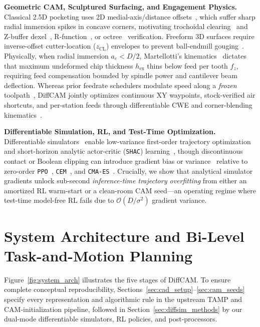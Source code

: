 \documentclass[conference]{IEEEtran}
\begin{document}
\textbf{Geometric CAM, Sculptured Surfacing, and Engagement Physics.}
Classical 2.5D pocketing uses 2D medial-axis/distance offsets~\cite{held1991pocket}, which suffer sharp radial immersion spikes in concave corners, motivating trochoidal clearing~\cite{rauch2009trochoidal} and Z-buffer dexel~\cite{vanhook1986dexel}, R-function~\cite{shapiro2007rfunctions}, or octree~\cite{coffland2021camotics} verification. Freeform 3D surfaces require inverse-offset cutter-location ($z_{\text{CL}}$) envelopes to prevent ball-endmill gouging~\cite{choi1998sculptured}. Physically, when radial immersion $a_e < D/2$, Martellotti's kinematics~\cite{martellotti1941milling,altintas2012manufacturing} dictates that maximum undeformed chip thickness $h_{\text{ex}}$ thins below feed per tooth $f_z$, requiring feed compensation bounded by spindle power and cantilever beam deflection. Whereas prior feedrate schedulers modulate speed along a \emph{frozen} toolpath~\cite{erkorkmaz2001highspeed}, DiffCAM jointly optimizes continuous XY waypoints, stock-verified air shortcuts, and per-station feeds through differentiable CWE and corner-blending kinematics~\cite{kramer2000rs274ngc}.

\textbf{Differentiable Simulation, RL, and Test-Time Optimization.}
Differentiable simulators~\cite{hu2020difftaichi,freeman2021brax} enable low-variance first-order trajectory optimization and short-horizon analytic actor-critic (\texttt{SHAC}) learning~\cite{xu2022accelerated}, though discontinuous contact or Boolean clipping can introduce gradient bias or variance~\cite{suh2022differentiable,metz2021gradients} relative to zero-order \texttt{PPO}~\cite{schulman2017proximal,schulman2016gae}, \texttt{CEM}~\cite{rubinstein2004cem}, and \texttt{CMA-ES}~\cite{hansen2001cmaes}. Crucially, we show that analytical simulator gradients unlock sub-second \emph{inference-time trajectory overfitting} from either an amortized RL warm-start or a clean-room CAM seed—an operating regime where test-time model-free RL fails due to $\mathcal{O}(D/\sigma^2)$ gradient variance.

\section{System Architecture and Bi-Level Task-and-Motion Planning}
\label{sec:formulation}

Figure~\ref{fig:system_arch} illustrates the five stages of DiffCAM. To ensure complete conceptual reproducibility, Sections~\ref{sec:cad_setup}--\ref{sec:cam_seeds} specify every representation and algorithmic rule in the upstream TAMP and CAM-initialization pipeline, followed in Section~\ref{sec:diffsim_methods} by our dual-mode differentiable simulators, RL policies, and post-processors.
\end{document}
